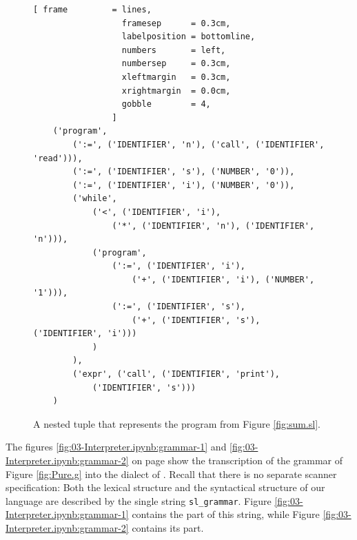 \begin{figure}[!ht]
\centering
\begin{Verbatim}[ frame         = lines,
                  framesep      = 0.3cm,
                  labelposition = bottomline,
                  numbers       = left,
                  numbersep     = 0.3cm,
                  xleftmargin   = 0.3cm,
                  xrightmargin  = 0.0cm,
                  gobble        = 4,
                ]
    ('program',
        (':=', ('IDENTIFIER', 'n'), ('call', ('IDENTIFIER', 'read'))),
        (':=', ('IDENTIFIER', 's'), ('NUMBER', '0')),
        (':=', ('IDENTIFIER', 'i'), ('NUMBER', '0')),
        ('while',
            ('<', ('IDENTIFIER', 'i'),
                ('*', ('IDENTIFIER', 'n'), ('IDENTIFIER', 'n'))),
            ('program',
                (':=', ('IDENTIFIER', 'i'),
                    ('+', ('IDENTIFIER', 'i'), ('NUMBER', '1'))),
                (':=', ('IDENTIFIER', 's'),
                    ('+', ('IDENTIFIER', 's'), ('IDENTIFIER', 'i')))
            )
        ),
        ('expr', ('call', ('IDENTIFIER', 'print'),
            ('IDENTIFIER', 's')))
    )
\end{Verbatim}
\vspace*{-0.3cm}
\caption{A nested tuple that represents the program from Figure \ref{fig:sum.sl}.}
\label{fig:sum.ast}
\end{figure}
\FloatBarrier

\noindent
The figures \ref{fig:03-Interpreter.ipynb:grammar-1} and \ref{fig:03-Interpreter.ipynb:grammar-2} on page
\pageref{fig:03-Interpreter.ipynb:grammar-1} show the transcription of the grammar of Figure
\ref{fig:Pure.g} into the  dialect of .  Recall that there is no separate
scanner specification:  Both the lexical structure and the syntactical structure of our language are
described by the single string \texttt{sl\_grammar}.  Figure \ref{fig:03-Interpreter.ipynb:grammar-1}
contains the  part of this string, while Figure \ref{fig:03-Interpreter.ipynb:grammar-2}
contains its  part.

